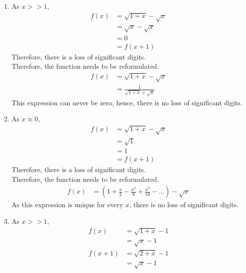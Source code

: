 \documentclass[fleqn, a4paper, 11pt, oneside]{amsart}
\theoremstyle{definition}
\theoremstyle{theorem}
\begin{document}
\begin{solution}
	\begin{enumerate}[leftmargin=*]
		\item
			As $x >> 1$,
			\begin{align*}
				f(x) & = \sqrt{1 + x} - \sqrt{x} \\
                                     & = \sqrt{x} - \sqrt{x}     \\
                                     & = 0                       \\
                                     & = f(x + 1)
			\end{align*}
			Therefore, there is a loss of significant digits.\\
			Therefore, the function needs to be reformulated.
			\begin{align*}
				f(x) & = \sqrt{1 + x} - \sqrt{x} \\
                                     & = \frac{1}{\sqrt{1 + x} + \sqrt{x}}
			\end{align*}
			This expression can never be zero, hence, there is no loss of significant digits.
		\item
			As $x \approx 0$,
			\begin{align*}
				f(x) & = \sqrt{1 + x} - \sqrt{x} \\
                                     & = \sqrt{1}                \\
                                     & = 1                       \\
                                     & = f(x + 1)
			\end{align*}
			Therefore, there is a loss of significant digits.\\
			Therefore, the function needs to be reformulated.
			\begin{align*}
				f(x) & = \left( 1 + \frac{x}{2} - \frac{x^2}{8} + \frac{x^3}{16} - \dots \right) - \sqrt{x}
			\end{align*}
			As this expression is unique for every $x$, there is no loss of significant digits.
		\item
			As $x >> 1$,
			\begin{align*}
				f(x)            & = \sqrt{1 + x} - 1 \\
                                                & = \sqrt{x} - 1     \\
				f(x + 1)        & = \sqrt{2 + x} - 1 \\
                                                & = \sqrt{x} - 1     \\

\end{align*}
\end{enumerate}
\end{solution}
\end{document}
